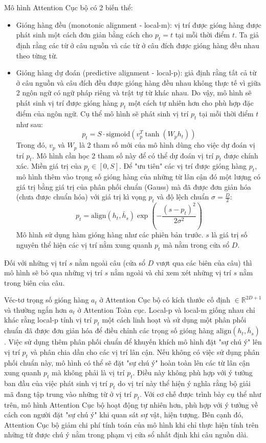 Mô hình Attention Cục bộ có 2 biến thể:
\begin{itemize}
	\item Gióng hàng đều (monotonic alignment - local-m): vị trí được gióng hàng được phát sinh một cách đơn giản bằng cách cho $p_t = t$ tại mỗi thời điểm $t$. Ta giả định rằng các từ ở câu nguồn và các từ ở câu đích được gióng hàng đều nhau theo từng từ.
	\item Gióng hàng dự đoán (predictive alignment - local-p): giả định rằng tất cả từ ở câu nguồn và câu đích đều được gióng hàng đều nhau không thực tế vì giữa 2 ngôn ngữ có ngữ pháp riêng và trật tự từ khác nhau. Do vậy, mô hình sẽ phát sinh vị trí được gióng hàng $p_t$ một cách tự nhiên hơn cho phù hợp đặc điểm của ngôn ngữ. Cụ thể mô hình sẽ phát sinh vị trí $p_t$ tại mỗi thời điểm $t$ như sau:
	\begin{equation}
	p_t = S \cdot \text{sigmoid} (v^T_p \tanh(W_p h_t))
	\end{equation}
	Trong đó, $v_p$ và $W_p$ là 2 tham số mới của mô hình dùng cho việc dự đoán vị trí $p_t$. Mô hình cần học 2 tham số này để có thể dự đoán vị trí $p_t$ được chính xác. Miền giá trị của $p_t \in [0, S]$.
	Để "ưu tiên" các vị trí được gióng hàng $p_t$, mô hình thêm vào trọng số gióng hàng của những từ lân cận đó một lượng có giá trị bằng giá trị của phân phối chuẩn (Gauss) mà đã được đơn giản hóa (chưa được chuẩn hóa) với giá trị kì vọng $p_t$ và độ lệch chuẩn $\sigma = \frac{D}{2}$:
	\begin{equation}
	p_t = \text{align}(h_t, \bar{h}_s)\exp\left(-\frac{(s-p_t)^2}{2\sigma^2}\right)
	\end{equation}
	Mô hình sử dụng hàm gióng hàng như các phiên bản trước. $s$ là giá trị số nguyên thể hiện các vị trí nằm xung quanh $p_t$ mà nằm trong cửa sổ $D$.
\end{itemize}
 Đối với những vị trí $s$ nằm ngoài câu (cửa sổ $D$ vượt qua các biên của câu) thì mô hình sẽ bỏ qua những vị trí $s$ nằm ngoài và chỉ xem xét những vị trí $s$ nằm trong biên của câu.
 
 Véc-tơ trọng số gióng hàng $a_t$ ở Attention Cục bộ có kích thước cố định $\in \mathbb{R}^{2D + 1}$ và thường ngắn hơn $a_t$ ở Attention Toàn cục. Local-p và local-m giống nhau chỉ khác rằng local-p tính vị trí $p_t$ một cách linh hoạt và sử dụng một phân phối chuẩn đã được đơn giản hóa để điều chỉnh các trọng số gióng hàng $\text{align}(h_t, \bar{h}_s)$. Việc sử dụng thêm phân phối chuẩn để khuyến khích mô hình đặt "sự chú ý" lên vị trí $p_t$ và phân chia dần cho các vị trí lân cận. Nếu không có việc sử dụng phân phối chuẩn này, mô hình có thể sẽ đặt "sự chú ý" hoàn toàn lên các từ lân cận xung quanh $p_t$ mà không phải là vị trí $p_t$. Điều này không phù hợp với ý tưởng ban đầu của việc phát sinh vị trí $p_t$ do vị trí này thể hiện ý nghĩa rằng bộ giải mã đang tập trung vào những từ ở vị trí $p_t$.
Với cơ chế được trình bày cụ thể như trên, mô hình Attention Cục bộ hoạt động tự nhiên hơn, phù hợp với ý tưởng về cách con người đặt "sự chú ý" khi quan sát sự vật, hiện tượng. Bên cạnh đó, Attention Cục bộ giảm chi phí tính toán của mô hình khi chỉ thực hiện tính trên những từ được chú ý nằm trong phạm vị cửa sổ nhất định khi câu nguồn dài.

